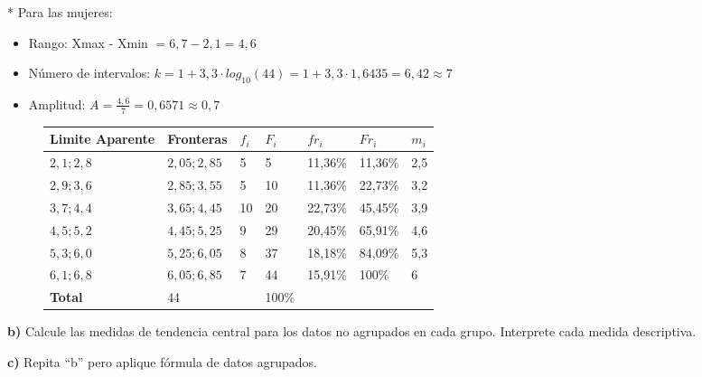 \documentclass{templateNote}
\begin{document}
\newpage
* Para las mujeres:\\
\begin{itemize}
    \item Rango: Xmax - Xmin $ = 6,7 - 2,1 = 4,6$
    
    \item Número de intervalos: $k = 1 + 3,3 \cdot log_{10}(44) = 1 + 3,3 \cdot 1,6435 = 6,42 \approx 7$
    
    \item Amplitud: $A = \frac{4,6}{7} = 0,6571 \approx 0,7$
\end{itemize}
\begin{figure}[H]
    \centering
    \begin{tabularx}{\textwidth}{|L|L|L|L|L|L|L|}
        \hline
        \textbf{Limite Aparente} & \textbf{Fronteras}& \textbf{$f_i$} & \textbf{$F_i$} & \textbf{$fr_i$} & \textbf{$Fr_i$} & \textbf{$m_i$} \\
        \hline
        $2,1;2,8$ & $2,05;2,85$ & 5 & 5 & 11,36\% & 11,36\% & 2,5 \\
        \hline
        $2,9;3,6$ & $2,85;3,55$ & 5 & 10 & 11,36\% & 22,73\% & 3,2 \\
        \hline
        $3,7;4,4$ & $3,65;4,45$ & 10 & 20 & 22,73\% & 45,45\% & 3,9 \\
        \hline
        $4,5;5,2$ & $4,45;5,25$ & 9 & 29 & 20,45\% & 65,91\% & 4,6 \\
        \hline
        $5,3;6,0$ & $5,25;6,05$ & 8 & 37 & 18,18\% & 84,09\% & 5,3 \\
        \hline
        $6,1;6,8$ & $6,05;6,85$ & 7 & 44 & 15,91\% & 100\% & 6 \\
        \hline
        \textbf{Total} & 44 &  & 100\% & & & \\
        \hline
    \end{tabularx}
\end{figure}

\textbf{b)} Calcule las medidas de tendencia central para los datos no agrupados en cada grupo. Interprete cada medida descriptiva.

\textbf{c)} Repita “b” pero aplique fórmula de datos agrupados.
\end{document}
